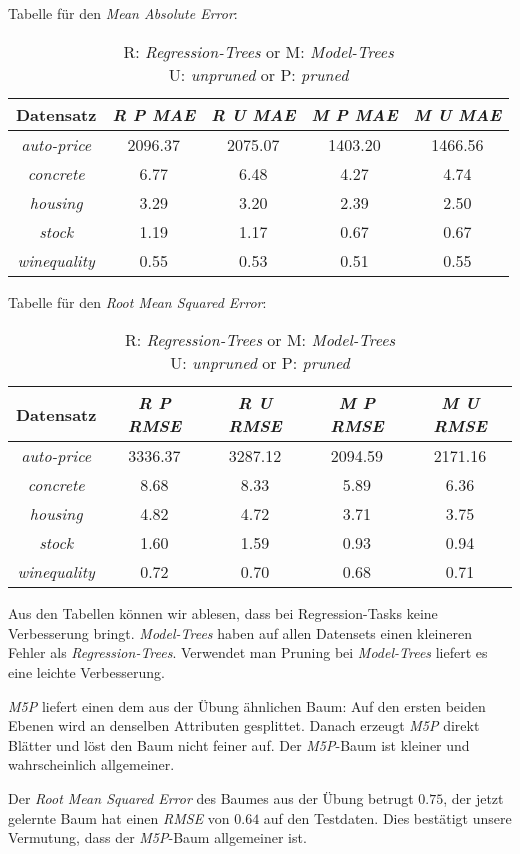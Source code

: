 
Tabelle f\"ur den \emph{Mean Absolute Error}:

\begin{table}
\begin{tabular}{c|c|c|c|c}
Datensatz  & \emph{R P MAE } & \emph{R U MAE} & \emph{M P MAE} & \emph{M U MAE} \\ \hline
\emph{auto-price}  & 2096.37 & 2075.07& 1403.20 & 1466.56 \\ \hline
\emph{concrete}    & 6.77    & 6.48   & 4.27    & 4.74     \\ \hline
\emph{housing}     & 3.29    & 3.20   & 2.39    & 2.50     \\ \hline
\emph{stock}       & 1.19    & 1.17   & 0.67    & 0.67     \\ \hline
\emph{winequality} & 0.55    & 0.53   & 0.51    & 0.55       
\end{tabular}
\caption{R: \emph{Regression-Trees} or M: \emph{Model-Trees} \\
U: \emph{unpruned} or P: \emph{pruned} }
\end{table}


Tabelle für den \emph{Root Mean Squared Error}:

\begin{table}
\begin{tabular}{c|c|c|c|c}
Datensatz  & \emph{R P RMSE} & \emph{R U RMSE} & \emph{M P RMSE} & \emph{M U RMSE} \\ \hline
\emph{auto-price}  & 3336.37  & 3287.12 & 2094.59 & 2171.16 \\ \hline
\emph{concrete}    & 8.68 & 8.33 & 5.89 & 6.36 \\ \hline
\emph{housing}     & 4.82 & 4.72 & 3.71 & 3.75 \\ \hline
\emph{stock}       & 1.60 & 1.59 & 0.93 & 0.94 \\ \hline
\emph{winequality} & 0.72 & 0.70 & 0.68 & 0.71   
\end{tabular}
\caption{R: \emph{Regression-Trees} or M: \emph{Model-Trees} \\
U: \emph{unpruned} or P: \emph{pruned} }
\end{table}


Aus den Tabellen k\"onnen wir ablesen, dass bei Regression-Tasks keine Verbesserung bringt. \emph{Model-Trees} haben auf allen Datensets einen kleineren Fehler als \emph{Regression-Trees}. Verwendet man Pruning bei \emph{Model-Trees} liefert es eine leichte Verbesserung.


\emph{M5P} liefert einen dem aus der \"Ubung \"ahnlichen Baum: Auf den ersten beiden Ebenen wird an denselben Attributen gesplittet. Danach erzeugt \emph{M5P} direkt Bl\"atter und l\"ost den Baum  nicht feiner auf. Der \emph{M5P}-Baum ist kleiner und wahrscheinlich allgemeiner. 

Der \emph{Root Mean Squared Error} des Baumes aus der \"Ubung betrugt $0.75$, der jetzt gelernte Baum hat einen \emph{RMSE} von $0.64$ auf den Testdaten. Dies best\"atigt unsere Vermutung, dass der \emph{M5P}-Baum allgemeiner ist.